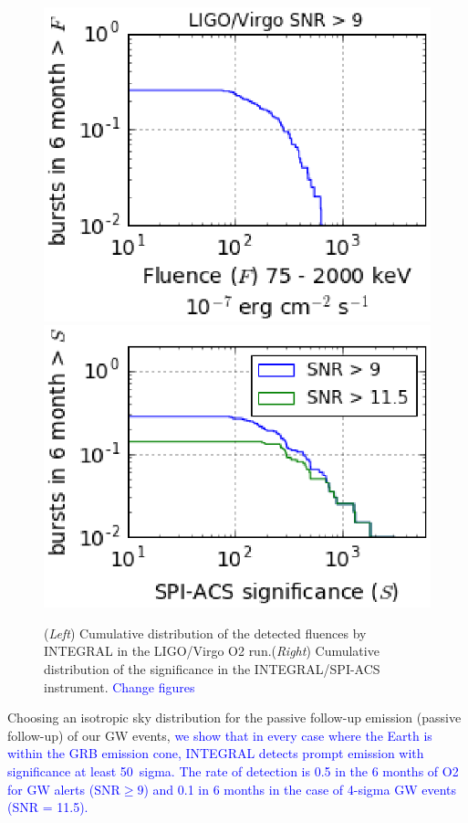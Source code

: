 \documentclass[11pt]{article}
\begin{document}
\begin{figure}
	\centering
    \includegraphics[scale=.6]{P7-1_f1.eps}
    \includegraphics[scale=.6]{P7-1_f2.eps}
    \caption{(\textit{Left}) Cumulative distribution of the
      detected fluences by INTEGRAL in the LIGO/Virgo O2
      run.(\textit{Right}) Cumulative distribution of the significance
      in the INTEGRAL/SPI-ACS instrument. \textcolor{blue}{Change figures}}
    \label{fluence_significance}
\end{figure}

Choosing an isotropic sky distribution for the passive follow-up emission (passive follow-up) 
of our GW events, \textcolor{blue}{we show that
in every case where the Earth is within the GRB emission cone,
INTEGRAL detects prompt emission with significance at least 50~sigma.
The rate of detection is 0.5 in the 6 months of O2 for GW alerts ($\mathrm{SNR} \geq 9$) 
and 0.1 in 6 months  in the case of 4-sigma GW events (SNR = 11.5).}
\end{document}
